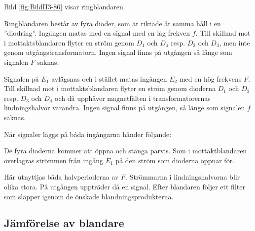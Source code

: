 Bild \ref{fig:BildII3-86} visar ringblandaren.

Ringblandaren består av fyra dioder, som är riktade åt samma håll i en
''diodring''.
Ingången matas med en signal med en låg frekven \(f\).
Till skillnad mot i mottaktsblandaren flyter en ström genom \(D_1\) och \(D_4\)
resp. \(D_2\) och \(D_3\), men inte genom utgångstransformatorn.
Ingen signal finns på utgången så länge som signalen \(F\) saknas.

Signalen på \(E_1\) avlägsnas och i stället matas ingången \(E_2\) med
en hög frekvens \(F\).
Till skillnad mot i mottaktsblandaren flyter en ström genom dioderna \(D_1\)
och \(D_2\) resp. \(D_3\) och \(D_4\) och då upphäver magnetfälten i
transformatorernas lindningshalvor varandra.
Ingen signal finns på utgången, så länge som signalen \(f\) saknas.

När signaler läggs på båda ingångarna händer följande:

De fyra dioderna kommer att öppna och stänga parvis.
Som i mottaktblandaren överlagras strömmen från ingång \(E_1\) på den ström
som dioderna öppnar för.

Här utnyttjas båda halvperioderna av \(F\).
Strömmarna i lindningshalvorna blir olika stora.
På utgången uppträder då en signal.
Efter blandaren följer ett filter som släpper igenom de önskade
blandningsprodukterna.

\subsection{Jämförelse av blandare}

